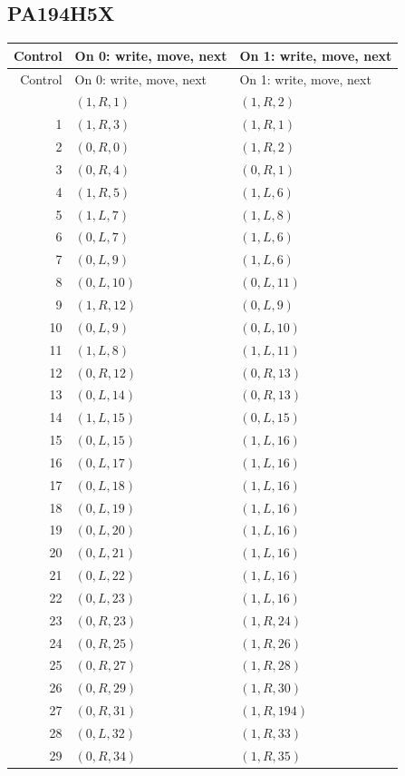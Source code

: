 \subsection{PA194H5X}
\begingroup\small
\begin{longtable}{@{}rll@{}}
\toprule Control & On 0: write, move, next & On 1: write, move, next\\
\midrule\endfirsthead
\toprule Control & On 0: write, move, next & On 1: write, move, next\\
\midrule\endhead
\bottomrule\endfoot
0 & $(1,R,1)$ & $(1,R,2)$\\
1 & $(1,R,3)$ & $(1,R,1)$\\
2 & $(0,R,0)$ & $(1,R,2)$\\
3 & $(0,R,4)$ & $(0,R,1)$\\
4 & $(1,R,5)$ & $(1,L,6)$\\
5 & $(1,L,7)$ & $(1,L,8)$\\
6 & $(0,L,7)$ & $(1,L,6)$\\
7 & $(0,L,9)$ & $(1,L,6)$\\
8 & $(0,L,10)$ & $(0,L,11)$\\
9 & $(1,R,12)$ & $(0,L,9)$\\
10 & $(0,L,9)$ & $(0,L,10)$\\
11 & $(1,L,8)$ & $(1,L,11)$\\
12 & $(0,R,12)$ & $(0,R,13)$\\
13 & $(0,L,14)$ & $(0,R,13)$\\
14 & $(1,L,15)$ & $(0,L,15)$\\
15 & $(0,L,15)$ & $(1,L,16)$\\
16 & $(0,L,17)$ & $(1,L,16)$\\
17 & $(0,L,18)$ & $(1,L,16)$\\
18 & $(0,L,19)$ & $(1,L,16)$\\
19 & $(0,L,20)$ & $(1,L,16)$\\
20 & $(0,L,21)$ & $(1,L,16)$\\
21 & $(0,L,22)$ & $(1,L,16)$\\
22 & $(0,L,23)$ & $(1,L,16)$\\
23 & $(0,R,23)$ & $(1,R,24)$\\
24 & $(0,R,25)$ & $(1,R,26)$\\
25 & $(0,R,27)$ & $(1,R,28)$\\
26 & $(0,R,29)$ & $(1,R,30)$\\
27 & $(0,R,31)$ & $(1,R,194)$\\
28 & $(0,L,32)$ & $(1,R,33)$\\
29 & $(0,R,34)$ & $(1,R,35)$\\

\end{longtable}
